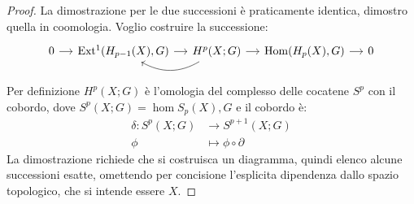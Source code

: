\begin{proof}
  La dimostrazione per le due successioni è praticamente identica, dimostro quella in coomologia.
  Voglio costruire la successione:
  \[
    \begin{tikzcd}[nodes = {column sep = 12 pt}]
      0 \rar & \ext{H_{p-1}(X), G} \rar & \arrow[bend left]{l}{} H^p(X;G) \rar & \hom{H_p(X), G} \rar & 0
    \end{tikzcd}
  \]
  Per definizione $ H^p(X;G) $ è l'omologia del complesso delle cocatene $ S^p $ con il cobordo,
  dove $ S^p(X;G) = \hom{S_p(X), G} $ e il cobordo è:
  \begin{align*}
    \delta \colon S^p(X;G) & \to S^{p+1}(X;G) \\
    \phi & \mapsto \phi \circ \partial
  \end{align*}
  La dimostrazione richiede che si costruisca un diagramma, quindi elenco alcune
  successioni esatte, omettendo per concisione l'esplicita dipendenza dallo spazio
  topologico, che si intende essere $ X $.


\end{proof}
